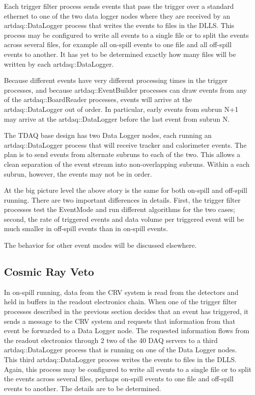 Each \art trigger filter process sends events that pass the trigger over a standard ethernet
to one of the two data logger nodes where they are received by an {\code artdaq::DataLogger} process
that writes the events to files in the DLLS.
This process may be configured to write all events to a single file
or to split the events across several files,
for example all on-spill events to one file and all off-spill events to another.
It has yet to be determined exactly how many files will be written
by each {\code artdaq::DataLogger}.

Because different events have very different processing times in the trigger processes,
and because {\code artdaq::EventBuilder} processes can draw events from
any of the {\code artdaq::BoardReader} processes, events will arrive at the
{\code artdaq::DataLogger} out of order.  In particular, early events from subrun N+1
may arrive at the {\code artdaq::DataLogger} before the last event from subrun N.

The TDAQ base design has two Data Logger nodes, each running an
{\code artdaq::DataLogger} process that will receive tracker and calorimeter events.
The plan is to send events from alternate subruns to each of the two.
This allows a clean separation of the event stream into non-overlapping subruns.
Within a each subrun, however, the events may not be in order.


At the big picture level the above story is the same for both on-spill and off-spill running.
There are two important differences in details.
First, the trigger filter processes test the EventMode
and run different algorithms for the two cases;
second, the rate of triggered events
and data volume per triggered event will be much smaller in off-spill events than in on-spill events.


The behavior for other event modes will be discussed elsewhere.

\subsection{Cosmic Ray Veto}
\label{ssec:CRV}

In on-spill running,
data from the CRV system is read from the detectors and held in buffers in the
readout electronics chain.
When one of the trigger filter processes described in the previous section
decides that an event has triggered,
it sends a message to the CRV system and requests that information from that
event be forwarded to a Data Logger node.
The requested information flows from the readout electronics through 2 two of the 40 DAQ servers
to a third {\code artdaq::DataLogger} process that is running on one of the Data Logger nodes.
This third {\code artdaq::DataLogger} process writes the events to files in the DLLS.
Again, this process may be configured to write all events to a single file
or to split the events across several files,
perhaps on-spill events to one file and off-spill events to another.
The details are to be determined.

